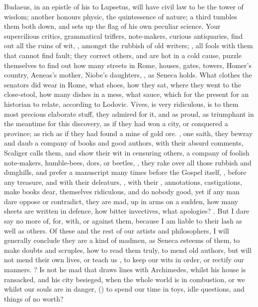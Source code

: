 Budaeus, in an epistle of his to Lupsetus, will have civil law to be the tower
of wisdom; another honours physic, the quintessence of nature; a third tumbles
them both down, and sets up the flag of his own peculiar science. Your
supercilious critics, grammatical triflers, note-makers, curious antiquaries,
find out all the ruins of wit, , amongst the rubbish of
old writers; , all fools with them that
cannot find fault; they correct others, and are hot in a cold cause, puzzle
themselves to find out how many streets in Rome, houses, gates, towers, Homer's
country, Aeneas's mother, Niobe's daughters, , as Seneca holds. What clothes the
senators did wear in Rome, what shoes, how they sat, where they went to the
close-stool, how many dishes in a mess, what sauce, which for the present for
an historian to relate, according to Lodovic. Vives, is
very ridiculous, is to them most precious elaborate stuff, they admired for it,
and as proud, as triumphant in the meantime for this discovery, as if they had
won a city, or conquered a province; as rich as if they had found a mine of
gold ore. , one saith, they bewray and daub a company of books and good
authors, with their absurd comments, 
Scaliger calls them, and show their wit in censuring
others, a company of foolish note-makers, humble-bees, dors, or beetles,
, they rake over all those rubbish and
dunghills, and prefer a manuscript many times before the Gospel itself,
, before any treasure, and with
their deleaturs, , with their
, annotations, castigations, \etc{} make books dear,
themselves ridiculous, and do nobody good, yet if any man dare oppose or
contradict, they are mad, up in arms on a sudden, how many sheets are written
in defence, how bitter invectives, what apologies?
. But I dare say
no more of, for, with, or against them, because I am liable to their lash as
well as others. Of these and the rest of our artists and philosophers, I will
generally conclude they are a kind of madmen, as Seneca
esteems of them, to make doubts and scruples, how to read them truly, to mend
old authors, but will not mend their own lives, or teach us , to keep our
wits in order, or rectify our manners. ? Is not he mad that draws lines with Archimedes,
whilst his house is ransacked, and his city besieged, when the whole world is
in combustion, or we whilst our souls are in danger, () to spend our time in toys, idle questions, and things of no worth?

